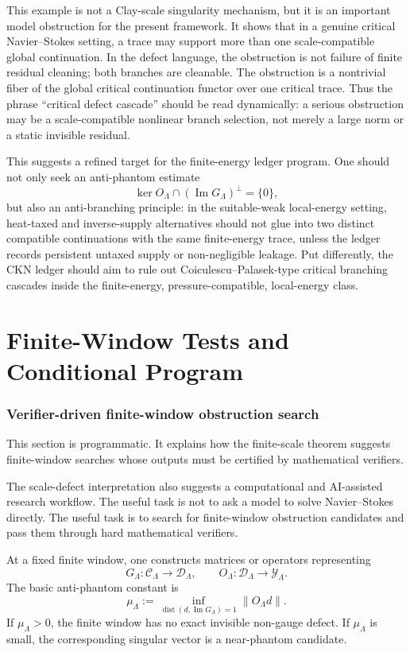 \documentclass[11pt]{article}
\numberwithin{equation}{section}
\newcommand{\calC}{\mathcal C}
\newcommand{\calD}{\mathcal D}
\newcommand{\calY}{\mathcal Y}
\newcommand{\Image}{\operatorname{Im}}
\newcommand{\Dist}{\operatorname{dist}}
\begin{document}
This example is not a Clay-scale singularity mechanism, but it is an important model obstruction for the present framework.  It shows that in a genuine critical Navier--Stokes setting, a trace may support more than one scale-compatible global continuation.  In the defect language, the obstruction is not failure of finite residual cleaning; both branches are cleanable.  The obstruction is a nontrivial fiber of the global critical continuation functor over one critical trace.  Thus the phrase ``critical defect cascade'' should be read dynamically: a serious obstruction may be a scale-compatible nonlinear branch selection, not merely a large norm or a static invisible residual.

This suggests a refined target for the finite-energy ledger program.  One should not only seek an anti-phantom estimate
\[
    \ker O_\Lambda\cap (\Image G_\Lambda)^\perp=\{0\},
\]
but also an anti-branching principle: in the suitable-weak local-energy setting, heat-taxed and inverse-supply alternatives should not glue into two distinct compatible continuations with the same finite-energy trace, unless the ledger records persistent untaxed supply or non-negligible leakage.  Put differently, the CKN ledger should aim to rule out Coiculescu--Palasek-type critical branching cascades inside the finite-energy, pressure-compatible, local-energy class.


\part{Finite-Window Tests and Conditional Program}
\section{Verifier-driven finite-window obstruction search}\label{sec:verifier-search}
\noindent This section is programmatic.  It explains how the finite-scale theorem suggests finite-window searches whose outputs must be certified by mathematical verifiers.

The scale-defect interpretation also suggests a computational and AI-assisted research workflow.  The useful task is not to ask a model to solve Navier--Stokes directly.  The useful task is to search for finite-window obstruction candidates and pass them through hard mathematical verifiers.

At a fixed finite window, one constructs matrices or operators representing
\[
    G_\Lambda:\calC_\Lambda\to\calD_\Lambda,
    \qquad
    O_\Lambda:\calD_\Lambda\to\calY_\Lambda.
\]
The basic anti-phantom constant is
\begin{equation}\label{eq:mu-Lambda}
    \mu_\Lambda
    :=
    \inf_{\Dist(d,\Image G_\Lambda)=1}\|O_\Lambda d\|.
\end{equation}
If $\mu_\Lambda>0$, the finite window has no exact invisible non-gauge defect.  If $\mu_\Lambda$ is small, the corresponding singular vector is a near-phantom candidate.
\end{document}
